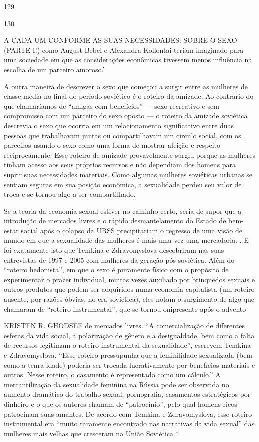  \par 
129
 \par 
130
 \par 
A CADA UM CONFORME AS SUAS NECESSIDADES: SOBRE O SEXO (PARTE I!) como August Bebel e Alexandra Kollontai teriam imaginado para uma sociedade em que as considerações econômicas tivessem menos influência na escolha de um parceiro amoroso.’
 \par 
A outra maneira de descrever o sexo que começou a surgir entre as mulheres de classe média no final do período soviético é o roteiro da amizade. Ao contrário do que chamaríamos de “amigas com benefícios” — sexo recreativo e sem compromisso com um parceiro do sexo oposto — o roteiro da amizade soviética descrevia o sexo que ocorria em um relacionamento significativo entre duas pessoas que trabalhavam juntas ou compartilhavam um círculo social, com os parceiros usando o sexo como uma forma de mostrar afeição e respeito reciprocamente. Esse roteiro de amizade provavelmente surgiu porque as mulheres tinham acesso aos seus próprios recursos e não dependiam dos homens para suprir suas necessidades materiais. Como algumas mulheres soviéticas urbanas se sentiam seguras em sua posição econômica, a sexualidade perdeu seu valor de troca e se tornou algo a ser compartilhado.
 \par 
Se a teoria da economia sexual estiver no caminho certo, seria de supor que a introdução de mercados livres e o rápido desmantelamento do Estado de bem-estar social após o colapso da URSS precipitariam o regresso de uma visão de mundo em que a sexualidade das mulheres é mais uma vez uma mercadoria. . E foi exatamente isto que Temkina e Zdravomyslova descobriram nas suas entrevistas de 1997 e 2005 com mulheres da geração pós-soviética. Além do “roteiro hedonista”, em que o sexo é puramente físico com o propósito de experimentar o prazer individual, muitas vezes auxiliado por brinquedos sexuais e outros produtos que podem ser adquiridos numa economia capitalista (um roteiro ausente, por razões óbvias, no era soviética), eles notam o surgimento de algo que chamaram de “roteiro instrumental”, que se tornou onipresente após o advento
 \par 
KRISTEN R. GHODSEE de mercados livres. “A comercialização de diferentes esferas da vida social, a polarização de gênero e a desigualdade, bem como a falta de recursos legitimam o roteiro instrumental da sexualidade”, escrevem Temkina e Zdravomyslova. “Esse roteiro pressupunha que a feminilidade sexualizada (bem como a tenra idade) poderia ser trocada lucrativamente por benefícios materiais e outros. Nesse roteiro, o casamento é representado como um cálculo.” A mercantilização da sexualidade feminina na Rússia pode ser observada no aumento dramático do trabalho sexual, pornografia, casamentos estratégicos por dinheiro e o que os autores chamam de “patrocínio”, pelo qual homens ricos patrocinam suas amantes. De acordo com Temkina e Zdravomyslova, esse roteiro instrumental era “muito raramente encontrado nas narrativas da vida sexual” das mulheres mais velhas que cresceram na União Soviética.*
